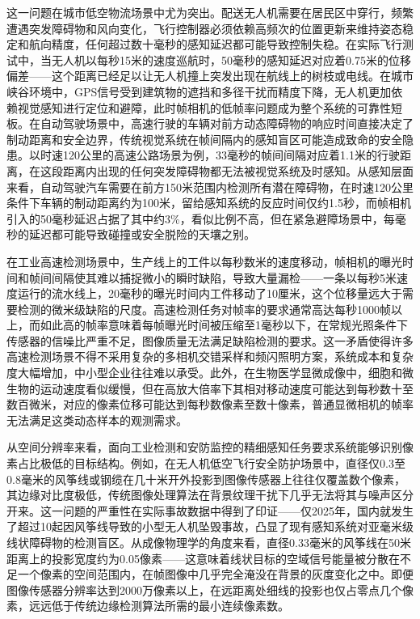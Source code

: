 这一问题在城市低空物流场景中尤为突出。配送无人机需要在居民区中穿行，频繁遭遇突发障碍物和风向变化，飞行控制器必须依赖高频次的位置更新来维持姿态稳定和航向精度，任何超过数十毫秒的感知延迟都可能导致控制失稳。在实际飞行测试中，当无人机以每秒15米的速度巡航时，50毫秒的感知延迟对应着0.75米的位移偏差——这个距离已经足以让无人机撞上突发出现在航线上的树枝或电线。在城市峡谷环境中，GPS信号受到建筑物的遮挡和多径干扰而精度下降，无人机更加依赖视觉感知进行定位和避障，此时帧相机的低帧率问题成为整个系统的可靠性短板。在自动驾驶场景中，高速行驶的车辆对前方动态障碍物的响应时间直接决定了制动距离和安全边界，传统视觉系统在帧间隔内的感知盲区可能造成致命的安全隐患。以时速120公里的高速公路场景为例，33毫秒的帧间间隔对应着1.1米的行驶距离，在这段距离内出现的任何突发障碍物都无法被视觉系统及时感知。从感知层面来看，自动驾驶汽车需要在前方150米范围内检测所有潜在障碍物，在时速120公里条件下车辆的制动距离约为100米，留给感知系统的反应时间仅约1.5秒，而帧相机引入的50毫秒延迟占据了其中约3\%，看似比例不高，但在紧急避障场景中，每毫秒的延迟都可能导致碰撞或安全脱险的天壤之别。

在工业高速检测场景中，生产线上的工件以每秒数米的速度移动，帧相机的曝光时间和帧间间隔使其难以捕捉微小的瞬时缺陷，导致大量漏检——一条以每秒5米速度运行的流水线上，20毫秒的曝光时间内工件移动了10厘米，这个位移量远大于需要检测的微米级缺陷的尺度。高速检测任务对帧率的要求通常高达每秒1000帧以上，而如此高的帧率意味着每帧曝光时间被压缩至1毫秒以下，在常规光照条件下传感器的信噪比严重不足，图像质量无法满足缺陷检测的要求。这一矛盾使得许多高速检测场景不得不采用复杂的多相机交错采样和频闪照明方案，系统成本和复杂度大幅增加，中小型企业往往难以承受。此外，在生物医学显微成像中，细胞和微生物的运动速度看似缓慢，但在高放大倍率下其相对移动速度可能达到每秒数十至数百微米，对应的像素位移可能达到每秒数像素至数十像素，普通显微相机的帧率无法满足这类动态样本的观测需求。

从空间分辨率来看，面向工业检测和安防监控的精细感知任务要求系统能够识别像素占比极低的目标结构。例如，在无人机低空飞行安全防护场景中，直径仅0.3至0.8毫米的风筝线或钢缆在几十米开外投影到图像传感器上往往仅覆盖数个像素，其边缘对比度极低，传统图像处理算法在背景纹理干扰下几乎无法将其与噪声区分开来。这一问题的严重性在实际事故数据中得到了印证——仅2025年，国内就发生了超过10起因风筝线导致的小型无人机坠毁事故，凸显了现有感知系统对亚毫米级线状障碍物的检测盲区。从成像物理学的角度来看，直径0.33毫米的风筝线在50米距离上的投影宽度约为0.05像素——这意味着线状目标的空域信号能量被分散在不足一个像素的空间范围内，在帧图像中几乎完全淹没在背景的灰度变化之中。即便图像传感器分辨率达到2000万像素以上，在远距离处细线的投影也仅占零点几个像素，远远低于传统边缘检测算法所需的最小连续像素数。

